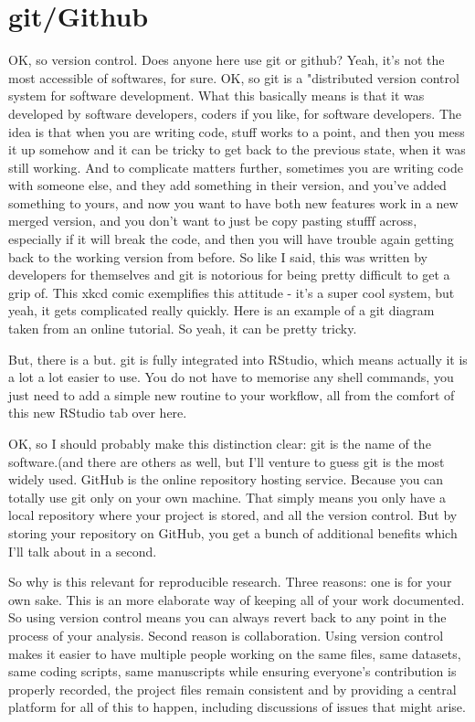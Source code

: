 \documentclass[12pt]{article}
\begin{document}
\section{git/Github}
OK, so version control. Does anyone here use git or github? Yeah, it's not the most accessible of softwares, for sure. OK, so git is a "distributed version control system for software development. What this basically means is that it was developed by software developers, coders if you like, for software developers. The idea is that when you are writing code, stuff works to a point, and then you mess it up somehow and it can be tricky to get back to the previous state, when it was still working. And to complicate matters further, sometimes you are writing code with someone else, and they add something in their version, and you've added something to yours, and now you want to have both new features work in a new merged version, and you don't want to just be copy pasting stufff across, especially if it will break the code, and then you will have trouble again getting back to the working version from before. So like I said, this was written by developers for themselves and git is notorious for being pretty difficult to get a grip of. This xkcd comic exemplifies this attitude - it's a super cool system, but yeah, it gets complicated really quickly. Here is an example of a git diagram taken from an online tutorial. So yeah, it can be pretty tricky. 


But, there is a but. git is fully integrated into RStudio, which means actually it is a lot a lot easier to use. You do not have to memorise any shell commands, you just need to add a simple new routine to your workflow, all from the comfort of this new RStudio tab over here. 

OK, so I should probably make this distinction clear: git is the name of the software.(and there are others as well, but I'll venture to guess git is the most widely used.  GitHub is the online repository hosting service. Because you can totally use git only on your own machine. That simply means you only have a local repository where your project is stored, and all the version control. But by storing your repository on GitHub, you get a bunch of additional benefits which I'll talk about in a second.  


So why is this relevant for reproducible research. Three reasons: one is for your own sake. This is an more elaborate way of keeping all of your work documented. So using version control means you can always revert back to any point in the process of your analysis. 
Second reason is collaboration. Using version control makes it easier to have multiple people working on the same files, same datasets, same coding scripts, same manuscripts while ensuring everyone's contribution is properly recorded, the project files remain consistent and by providing a central platform for all of this to happen, including discussions of issues that might arise. 
\end{document}
